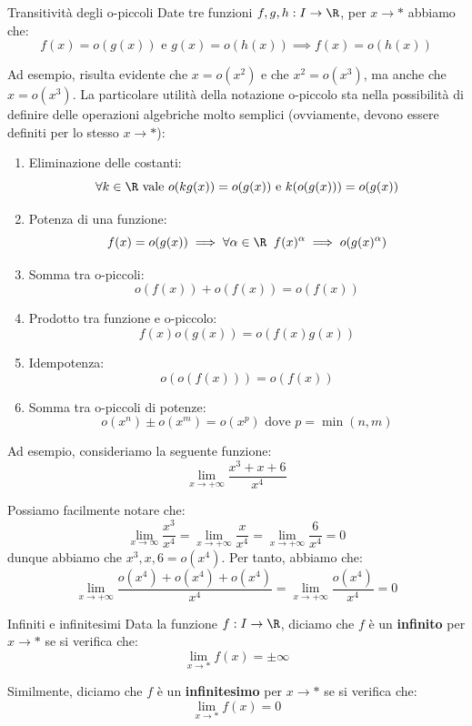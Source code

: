 \documentclass[a4paper, 12pt]{report}
\begin{document}
    \begin{framedobs}{Transitività degli o-piccoli}
        Date tre funzioni $f,g, h : I \to \R$, per $x \to *$ abbiamo che:
        \[f(x) = o(g(x)) \text{ e } g(x) = o(h(x)) \implies f(x) = o(h(x))\]
    \end{framedobs}

    Ad esempio, risulta evidente che $x = o(x^2)$ e che $x^2 = o(x^3)$, ma anche che $x = o(x^3)$. La particolare utilità della notazione o-piccolo sta nella possibilità di definire delle operazioni algebriche molto semplici (ovviamente, devono essere definiti per lo stesso $x \to *$):
    \begin{enumerate}
        \item Eliminazione delle costanti:
        \[\forall k \in \R \text{ vale } o(k g(x)) = o(g(x)) \text{ e } k(o(g(x))) = o(g(x))\]

        \item Potenza di una funzione:
        \[f(x) = o(g(x)) \implies \forall \alpha \in \R \;\; f(x)^{\alpha} \implies o(g(x)^\alpha)\]

        \item Somma tra o-piccoli:
        \[o(f(x)) + o (f(x)) = o(f(x))\]

        \item Prodotto tra funzione e o-piccolo:
        \[f(x) o(g(x)) = o(f(x)g(x))\]

        \item Idempotenza:
        \[o(o(f(x))) = o(f(x))\]

        \item Somma tra o-piccoli di potenze:
        \[o(x^n) \pm o(x^m) = o(x^p) \text{ dove } p = \min(n,m)\]
    \end{enumerate}

    Ad esempio, consideriamo la seguente funzione:
    \[\lim_{x \to +\infty} \frac{x^3+x+6}{x^4}\]

    Possiamo facilmente notare che:
    \[\lim_{x \to \infty} \frac{x^3}{x^4} = \lim_{x \to +\infty} \frac{x}{x^4} = \lim_{x \to +\infty} \frac{6}{x^4} = 0\]
    dunque abbiamo che $x^3, x, 6 = o(x^4)$. Per tanto, abbiamo che:
    \[\lim_{x \to +\infty} \frac{o(x^4) + o(x^4) + o(x^4)}{x^4} = \lim_{x \to +\infty} \frac{o(x^4)}{x^4} = 0\]

    \begin{frameddefn}{Infiniti e infinitesimi}
        Data la funzione $f : I \to \R$, diciamo che $f$ è un \textbf{infinito} per $x \to *$ se si verifica che:
        \[\lim_{x \to *} f(x) = \pm\infty \]

        Similmente, diciamo che $f$ è un \textbf{infinitesimo} per $x \to *$ se si verifica che:
        \[\lim_{x \to *} f(x) = 0\]
    \end{frameddefn}
\end{document}

